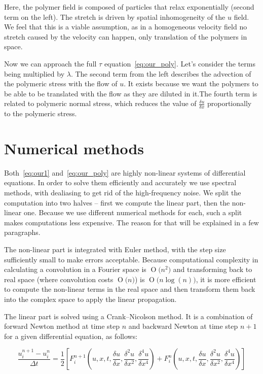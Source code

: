 \documentclass[11pt,a4paper]{article}
\newcommand{\BigO}[1]{\ensuremath{\operatorname{O}\bigl(#1\bigr)}}
\begin{document}
Here, the polymer field is composed of particles that relax exponentially (second term on the left).
The stretch is driven by spatial inhomogeneity of the $u$ field.
We feel that this is a viable assumption, as in a homogeneous velocity field no stretch caused by the velocity can happen, only translation of the polymers in space.

Now we can approach the full $\tau$ equation~\eqref{eq:our_poly}.
Let's consider the terms being multiplied by $\lambda$.
The second term from the left describes the advection of the polymeric stress with the flow of $u$.
It exists because we want the polymers to be able to be translated with the flow as they are diluted in it.The fourth term is related to polymeric normal stress, which reduces the value of $\frac{\delta u}{\delta x}$ proportionally to the polymeric stress.

\section{Numerical methods}
Both~\eqref{eq:our1} and~\eqref{eq:our_poly} are highly non-linear systems of differential equations.
In order to solve them efficiently and accurately we use spectral methods\cite{Orszag80}, with dealiasing to get rid of the high-frequency noise.
We split the computation into two halves -- first we compute the linear part, then the non-linear one.
Because we use different numerical methods for each, such a split makes computations less expensive.
The reason for that will be explained in a few paragraphs.

The non-linear part is integrated with Euler method, with the step size sufficiently small to make errors acceptable.
Because computational complexity in calculating a convolution in a Fourier space is \BigO{n^2} and transforming back to real space (where convolution costs \BigO{n}) is \BigO{n\log(n)}, it is more efficient to compute the non-linear terms in the real space and then transform them back into the complex space to apply the linear propagation.

The linear part is solved using a Crank--Nicolson\cite{Crank47} method.
It is a combination of forward Newton method at time step $n$ and backward Newton at time step $n + 1$ for a given differential equation,  as follows:

\begin{equation}\label{eq:cn1}
    \frac{u^{n+1}_i - u^n_i}{\Delta t} = \frac{1}{2}[F^{n+1}_i(u, x, t, \frac{\delta u}{\delta x}, \frac{\delta^2u}{\delta x^2}, \frac{\delta^4u}{\delta x^4}) + F^n_i(u, x, t, \frac{\delta u}{\delta x}, \frac{\delta^2u}{\delta x^2}, \frac{\delta^4u}{\delta x^4})]
\end{equation}
\end{document}
